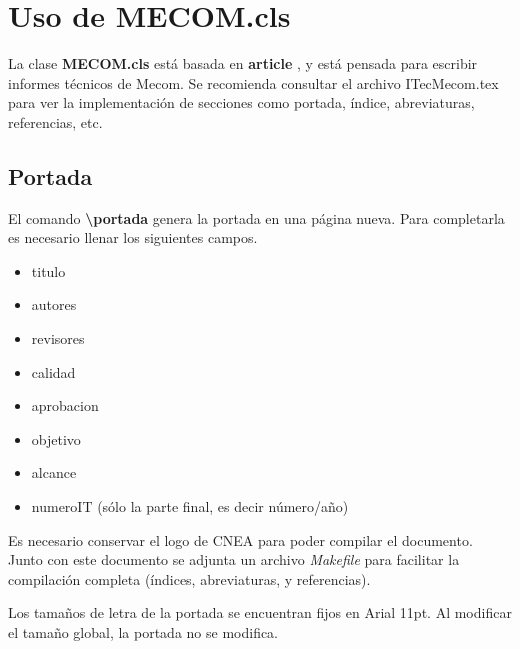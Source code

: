 \documentclass[a4paper,11pt,twoside]{MECOM}
\begin{document}
    \portada
    
    \tableofcontents   
    
    \printnomenclature[2cm]


        
    \section{Uso de MECOM.cls}
    La clase {\bf MECOM.cls} est\'a basada en {\bf article} \cite{hefferon_minutes_2005}, y est\'a pensada para escribir informes t\'ecnicos de Mecom. Se recomienda consultar el archivo ITec\textunderscore Mecom.tex para ver la implementaci\'on de secciones como portada, \'indice, abreviaturas, referencias, etc.



    
    \subsection{Portada}
        El comando {\bf \textbackslash portada} genera la portada en una p\'agina nueva. Para completarla es necesario llenar los siguientes campos.
        \begin{itemize}
            \item titulo
            \item autores
            \item revisores
            \item calidad
            \item aprobacion
            \item objetivo
            \item alcance
            \item numeroIT (s\'olo la parte final, es decir n\'umero/a\~no)
        \end{itemize}
        \par
        Es necesario conservar el logo de CNEA para poder compilar el documento. Junto con este documento se adjunta un archivo \emph{Makefile} para facilitar la compilaci\'on completa (\'indices, abreviaturas, y referencias).
        \par
        Los tama\~nos de letra de la portada se encuentran fijos en Arial 11pt. Al modificar el tama\~no global, la portada no se modifica.
\end{document}
